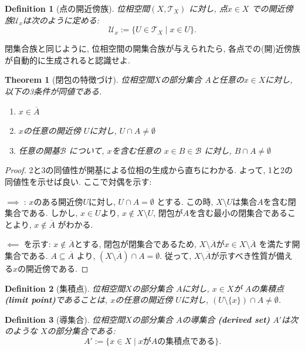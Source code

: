 \documentclass[dvipdfmx]{jbook}
\newcommand{\cl}[1]{\overline{ #1}  }
\newtheorem{theorem}{Theorem}[section]
\newtheorem{definition}{Definition}[section]
\theoremstyle{remark}
\theoremstyle{plain}
\begin{document}
\begin{definition}[点の開近傍族]
	位相空間$\left( X, \mathcal{T}_X \right) $ に対し, 点$x \in X$ での開近傍族$\mathcal{U}_x$は次のように定める:
	\[
	\mathcal{U}_x := \{U \in \mathcal{T}_X \mid x \in U\} 
	.\] 
\end{definition}


閉集合族と同じように, 位相空間の開集合族が与えられたら, 各点での(開)近傍族が自動的に生成されると認識せよ.

\begin{theorem}[閉包の特徴づけ]
	位相空間$X$の部分集合 $A$と任意の$x \in X$に対し, 以下の3条件が同値である.
	 \begin{enumerate}
		\item $x \in \cl{A}$
		\item  $x$の任意の開近傍 $U$に対し,  $U\cap A \neq \emptyset$
		\item  任意の開基$\mathcal{B}$ について, $x$を含む任意の $ x \in B \in \mathcal{B}$ に対し, $B\cap A \neq \emptyset$
	\end{enumerate}
\end{theorem}

\begin{proof}
	2と3の同値性が開基による位相の生成から直ちにわかる. よって, 1と2の同値性を示せば良い.
ここで対偶を示す:

$\implies$ : $x$のある開近傍$U$に対し,  $U \cap A = \emptyset$ とする. 
この時,  $X \setminus U$は集合$A$を含む閉集合である. 
しかし,  $x \in U $より, $x \not\in X \setminus U$, 閉包が$A$を含む最小の閉集合であることより, $x \not\in \cl{A}$ がわかる.

$\impliedby$ を示す: $x \not\in \cl{A} $とする, 閉包が閉集合であるため, $X \setminus \cl{A}$が$x \in X \setminus \cl{A}$ を満たす開集合である. 
$A \subseteq \cl{A}$ より, $\left( X\setminus \cl{A} \right) \cap A = \emptyset$. 
従って, $X \setminus \cl{A}$が示すべき性質が備える$x$の開近傍である.
	
\end{proof}

\begin{definition}[集積点]
	位相空間$X$の部分集合 $A$に対し,  $x \in X$が $A$の集積点\textbf{(limit point)}であることは,
$x$の任意の開近傍 $U$に対し,  $\left( U\setminus \{x\}  \right) \cap A \neq \emptyset $.
\end{definition}

\begin{definition}[導集合]
	位相空間$X$の部分集合 $A$の導集合 \textbf{(derived set)} $A'$は次のような $X$の部分集合である:
	 \[
	A' := \{x \in X  \mid  x がAの集積点である\} 
	.\] 
\end{definition}
\end{document}
